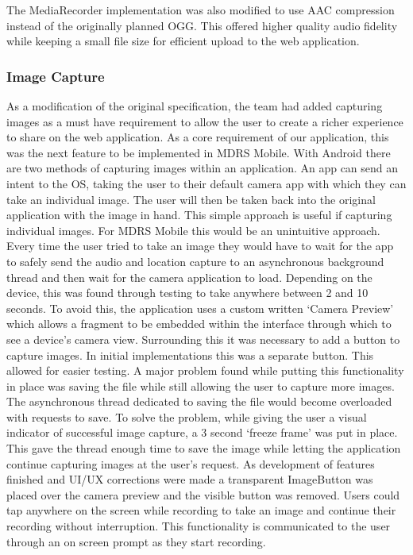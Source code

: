 \documentclass{l3proj}
\begin{document}
The MediaRecorder implementation was also modified to use AAC compression instead of the originally planned OGG. This offered higher quality audio fidelity while keeping a small file size for efficient upload to the web application.

\subsubsection{Image Capture}
As a modification of the original specification, the team had added capturing images as a must have requirement to allow the user to create a richer experience to share on the web application. As a core requirement of our application, this was the next feature to be implemented in MDRS Mobile. With Android there are two methods of capturing images within an application. An app can send an intent to the OS, taking the user to their default camera app with which they can take an individual image. The user will then be taken back into the original application with the image in hand. This simple approach is useful if capturing individual images. For MDRS Mobile this would be an unintuitive approach. Every time the user tried to take an image they would have to wait for the app to safely send the audio and location capture to an asynchronous background thread and then wait for the camera application to load. Depending on the device, this was found through testing to take anywhere between 2 and 10 seconds. To avoid this, the application uses a custom written ‘Camera Preview’ which allows a fragment to be embedded within the interface through which to see a device’s camera view. Surrounding this it was necessary to add a button to capture images. In initial implementations this was a separate button. This allowed for easier testing. A major problem found while putting this functionality in place was saving the file while still allowing the user to capture more images. The asynchronous thread dedicated to saving the file would become overloaded with requests to save. To solve the problem, while giving the user a visual indicator of successful image capture, a 3 second ‘freeze frame’ was put in place. This gave the thread enough time to save the image while letting the application continue capturing images at the user's request. As development of features finished and UI/UX corrections were made a transparent ImageButton was placed over the camera preview and the visible button was removed. Users could tap anywhere on the screen while recording to take an image and continue their recording without interruption. This functionality is communicated to the user through an on screen prompt as they start recording.
\end{document}
